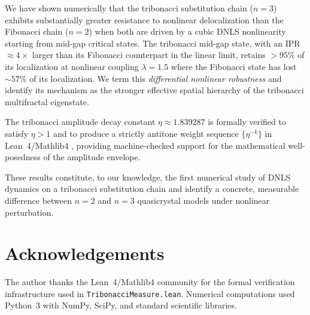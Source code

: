 \documentclass[12pt,a4paper]{article}
\begin{document}
We have shown numerically that the tribonacci substitution chain ($n=3$)
exhibits substantially greater resistance to nonlinear delocalization than the
Fibonacci chain ($n=2$) when both are driven by a cubic DNLS nonlinearity
starting from mid-gap critical states. The tribonacci mid-gap state, with an
IPR $\approx 4\times$ larger than its Fibonacci counterpart in the linear
limit, retains $> 95\%$ of its localization at nonlinear coupling $\lambda =
1.5$ where the Fibonacci state has lost $\sim 57\%$ of its localization. We
term this \emph{differential nonlinear robustness} and identify its mechanism
as the stronger effective spatial hierarchy of the tribonacci multifractal
eigenstate.

The tribonacci amplitude decay constant $\eta \approx 1.839287$ is formally
verified to satisfy $\eta > 1$ and to produce a strictly antitone weight
sequence $\{\eta^{-k}\}$ in Lean~4/Mathlib4 \cite{AXLE2026}, providing
machine-checked support for the mathematical well-posedness of the amplitude
envelope.

These results constitute, to our knowledge, the first numerical study of
DNLS dynamics on a tribonacci substitution chain and identify a concrete,
measurable difference between $n=2$ and $n=3$ quasicrystal models under
nonlinear perturbation.

\section*{Acknowledgements}

The author thanks the Lean~4/Mathlib4 community for the formal verification
infrastructure used in \texttt{TribonacciMeasure.lean}. Numerical computations
used Python~3 with NumPy, SciPy, and standard scientific libraries.
\end{document}
